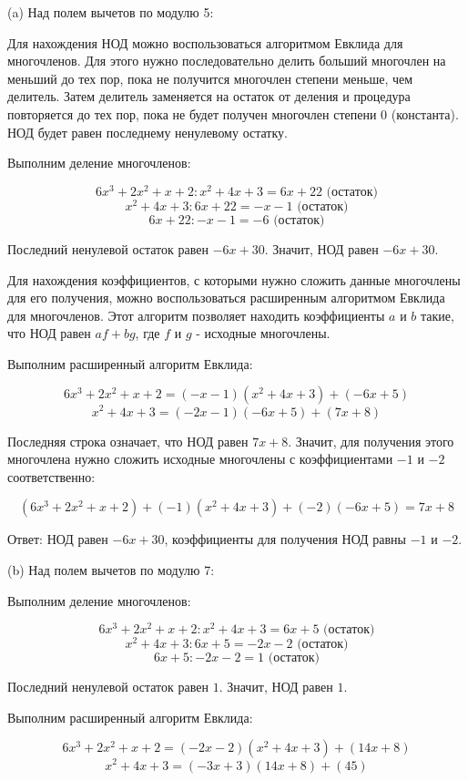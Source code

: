 \documentclass{article}
\begin{document}
\newpage

(a) Над полем вычетов по модулю 5:

Для нахождения НОД можно воспользоваться алгоритмом Евклида для многочленов. Для этого нужно последовательно делить больший многочлен на меньший до тех пор, пока не получится многочлен степени меньше, чем делитель. Затем делитель заменяется на остаток от деления и процедура повторяется до тех пор, пока не будет получен многочлен степени 0 (константа). НОД будет равен последнему ненулевому остатку.

Выполним деление многочленов:

$$6x^3 + 2x^2 + x + 2 : x^2 + 4x + 3 = 6x + 22 \text{ (остаток)}$$
$$x^2 + 4x + 3 : 6x + 22 = -x - 1 \text{ (остаток)}$$
$$6x + 22 : -x - 1 = -6 \text{ (остаток)}$$

Последний ненулевой остаток равен $-6x+30$. Значит, НОД равен $-6x+30$.

Для нахождения коэффициентов, с которыми нужно сложить данные многочлены для его получения, можно воспользоваться расширенным алгоритмом Евклида для многочленов. Этот алгоритм позволяет находить коэффициенты $a$ и $b$ такие, что НОД равен $af + bg$, где $f$ и $g$ - исходные многочлены.

Выполним расширенный алгоритм Евклида:

$$6x^3 + 2x^2 + x + 2 = (-x - 1)(x^2 + 4x + 3) + (-6x + 5)$$
$$x^2 + 4x + 3 = (-2x - 1)(-6x + 5) + (7x + 8)$$

Последняя строка означает, что НОД равен $7x+8$. Значит, для получения этого многочлена нужно сложить исходные многочлены с коэффициентами $-1$ и $-2$ соответственно:

$$(6x^3 + 2x^2 + x + 2) + (-1)(x^2 + 4x + 3) + (-2)(-6x + 5) = 7x + 8$$

Ответ: НОД равен $-6x+30$, коэффициенты для получения НОД равны $-1$ и $-2$.

(b) Над полем вычетов по модулю 7:

Выполним деление многочленов:

$$6x^3 + 2x^2 + x + 2 : x^2 + 4x + 3 = 6x + 5 \text{ (остаток)}$$
$$x^2 + 4x + 3 : 6x + 5 = -2x - 2 \text{ (остаток)}$$
$$6x + 5 : -2x - 2 = 1 \text{ (остаток)}$$

Последний ненулевой остаток равен $1$. Значит, НОД равен $1$.

Выполним расширенный алгоритм Евклида:

$$6x^3 + 2x^2 + x + 2 = (-2x - 2)(x^2 + 4x + 3) + (14x + 8)$$
$$x^2 + 4x + 3 = (-3x + 3)(14x + 8) + (45)$$
\end{document}
